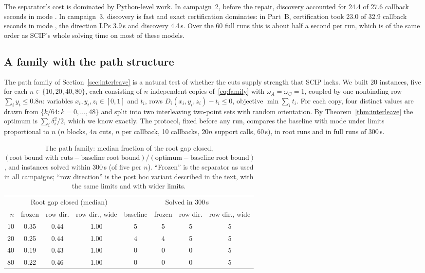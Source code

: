 The separator's cost is dominated by Python-level work. In campaign~2,
before the repair, discovery accounted for 24.4 of 27.6 callback seconds in
mode . In campaign~3, discovery is fast and exact certification
dominates: in Part~B, certification took 23.0 of 32.9 callback seconds in
mode , the direction LPs 3.9\,s and discovery 4.4\,s. Over the 60
full runs this is about half a second per run, which is of the same order as
SCIP's whole solving time on most of these models.

\subsection{A family with the path structure}\label{sec:mechanism}

The path family of Section~\ref{sec:interleave} is a natural test of
whether the cuts supply strength that SCIP lacks. We built 20 instances,
five for each $n\in\{10,20,40,80\}$, each consisting of $n$ independent copies
of~\eqref{eq:family} with $\omega_A=\omega_C=1$, coupled by one nonbinding
row $\sum_iy_i\le0.8n$: variables $x_i,y_i,z_i\in[0,1]$ and $t_i$, rows
$D_i(x_i,y_i,z_i)-t_i\le0$, objective $\min\sum_it_i$. For each copy, four
distinct values are drawn from $\{k/64:k=0,\dots,48\}$ and split into two
interleaving two-point sets with random orientation. By
Theorem~\ref{thm:interleave} the optimum is $\sum_i\delta_i^2/2$, which we
know exactly. The protocol, fixed before any run, compares the baseline
with mode  under limits proportional to $n$ ($n$ blocks, $4n$ cuts,
$n$ per callback, 10 callbacks, $20n$ support calls, 60\,s), in root runs
and in full runs of 300\,s.

\begin{table}[t]
\centering\small
\caption{The path family: median fraction of the root gap closed,
$(\text{root bound with cuts}-\text{baseline root bound})/(\text{optimum}-\text{baseline root bound})$,
and instances solved within 300\,s (of five per $n$). ``Frozen'' is the
separator as used in all campaigns; ``row direction'' is the post hoc
variant described in the text, with the same limits and with wider
limits.}\label{tab:mechanism}
\begin{tabular}{@{}rccccccc@{}}
\toprule
& \multicolumn{3}{c}{Root gap closed (median)} & \multicolumn{4}{c}{Solved in 300\,s}\\
\cmidrule(lr){2-4}\cmidrule(l){5-8}
$n$ & frozen & row dir. & row dir., wide & baseline & frozen & row dir. & row dir., wide\\
\midrule
10 & 0.35 & 0.44 & 1.00 & 5 & 5 & 5 & 5\\
20 & 0.25 & 0.44 & 1.00 & 4 & 4 & 5 & 5\\
40 & 0.19 & 0.43 & 1.00 & 0 & 0 & 0 & 5\\
80 & 0.22 & 0.46 & 1.00 & 0 & 0 & 0 & 5\\
\bottomrule
\end{tabular}
\end{table}

